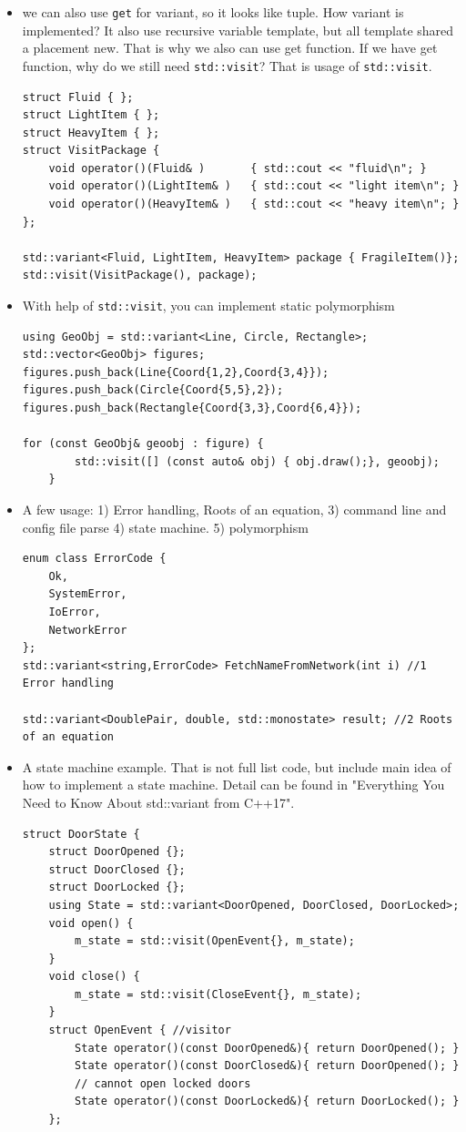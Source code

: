 \documentclass[a4paper,11pt,twoside]{book}
\begin{document}
\begin{itemize}
	
	
	\item we can also use \texttt{get} for variant, so it looks like tuple. How variant is implemented? It also use recursive variable template, but all template shared a placement new. That is why we also can use get function. If we have get function, why do we still need \texttt{std::visit}? That is usage of \texttt{std::visit}.
\begin{lstlisting}
struct Fluid { };
struct LightItem { };
struct HeavyItem { };
struct VisitPackage {
	void operator()(Fluid& )       { std::cout << "fluid\n"; }
	void operator()(LightItem& )   { std::cout << "light item\n"; }
	void operator()(HeavyItem& )   { std::cout << "heavy item\n"; }
};

std::variant<Fluid, LightItem, HeavyItem> package { FragileItem()};
std::visit(VisitPackage(), package);
\end{lstlisting}	
	
	\item With help of \texttt{std::visit}, you can implement static polymorphism
	
\begin{lstlisting}
using GeoObj = std::variant<Line, Circle, Rectangle>;
std::vector<GeoObj> figures;
figures.push_back(Line{Coord{1,2},Coord{3,4}});
figures.push_back(Circle{Coord{5,5},2});  
figures.push_back(Rectangle{Coord{3,3},Coord{6,4}});  

for (const GeoObj& geoobj : figure) {
		std::visit([] (const auto& obj) { obj.draw();}, geoobj);
	}
\end{lstlisting}	
	
	\item A few usage: 1) Error handling, Roots of an equation, 3) command line and config file parse 4) state machine. 5) polymorphism
	
\begin{lstlisting}
enum class ErrorCode {
	Ok,
	SystemError,
	IoError,
	NetworkError
};
std::variant<string,ErrorCode> FetchNameFromNetwork(int i) //1 Error handling

std::variant<DoublePair, double, std::monostate> result; //2 Roots of an equation	
\end{lstlisting}	
	
	\item A state machine example. That is not full list code, but include main idea of how to implement a state machine. Detail can be found in "Everything You Need to Know About std::variant from C++17".
\begin{lstlisting}
struct DoorState {
	struct DoorOpened {};
	struct DoorClosed {};
	struct DoorLocked {};
	using State = std::variant<DoorOpened, DoorClosed, DoorLocked>;
	void open() {
		m_state = std::visit(OpenEvent{}, m_state);
	}
	void close() {
		m_state = std::visit(CloseEvent{}, m_state);
	}	
	struct OpenEvent { //visitor
		State operator()(const DoorOpened&){ return DoorOpened(); }
		State operator()(const DoorClosed&){ return DoorOpened(); }
		// cannot open locked doors
		State operator()(const DoorLocked&){ return DoorLocked(); } 
	};
	

\end{lstlisting}
\end{itemize}
\end{document}

